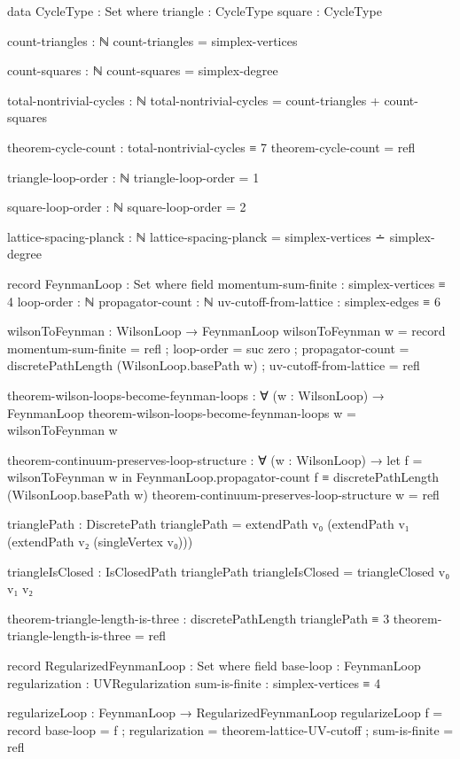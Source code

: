 \documentclass[11pt,a4paper]{book}
\begin{document}
\begin{code}
data CycleType : Set where
  triangle : CycleType
  square   : CycleType

count-triangles : ℕ
count-triangles = simplex-vertices

count-squares : ℕ
count-squares = simplex-degree


total-nontrivial-cycles : ℕ
total-nontrivial-cycles = count-triangles + count-squares

theorem-cycle-count : total-nontrivial-cycles ≡ 7
theorem-cycle-count = refl

triangle-loop-order : ℕ
triangle-loop-order = 1

square-loop-order : ℕ
square-loop-order = 2

lattice-spacing-planck : ℕ
lattice-spacing-planck = simplex-vertices ∸ simplex-degree

record FeynmanLoop : Set where
  field
    momentum-sum-finite    : simplex-vertices ≡ 4
    loop-order             : ℕ
    propagator-count       : ℕ
    uv-cutoff-from-lattice : simplex-edges ≡ 6

wilsonToFeynman : WilsonLoop → FeynmanLoop
wilsonToFeynman w = record
  { momentum-sum-finite    = refl
  ; loop-order             = suc zero
  ; propagator-count       = discretePathLength (WilsonLoop.basePath w)
  ; uv-cutoff-from-lattice = refl
  }

theorem-wilson-loops-become-feynman-loops : ∀ (w : WilsonLoop) →
  FeynmanLoop
theorem-wilson-loops-become-feynman-loops w = wilsonToFeynman w

theorem-continuum-preserves-loop-structure : 
  ∀ (w : WilsonLoop) → 
  let f = wilsonToFeynman w in
  FeynmanLoop.propagator-count f ≡ discretePathLength (WilsonLoop.basePath w)
theorem-continuum-preserves-loop-structure w = refl

trianglePath : DiscretePath
trianglePath = extendPath v₀ (extendPath v₁ (extendPath v₂ (singleVertex v₀)))

triangleIsClosed : IsClosedPath trianglePath
triangleIsClosed = triangleClosed v₀ v₁ v₂

theorem-triangle-length-is-three : discretePathLength trianglePath ≡ 3
theorem-triangle-length-is-three = refl

record RegularizedFeynmanLoop : Set where
  field
    base-loop       : FeynmanLoop
    regularization  : UVRegularization
    sum-is-finite   : simplex-vertices ≡ 4

regularizeLoop : FeynmanLoop → RegularizedFeynmanLoop
regularizeLoop f = record
  { base-loop      = f
  ; regularization = theorem-lattice-UV-cutoff
  ; sum-is-finite  = refl
  }


\end{code}
\end{document}
